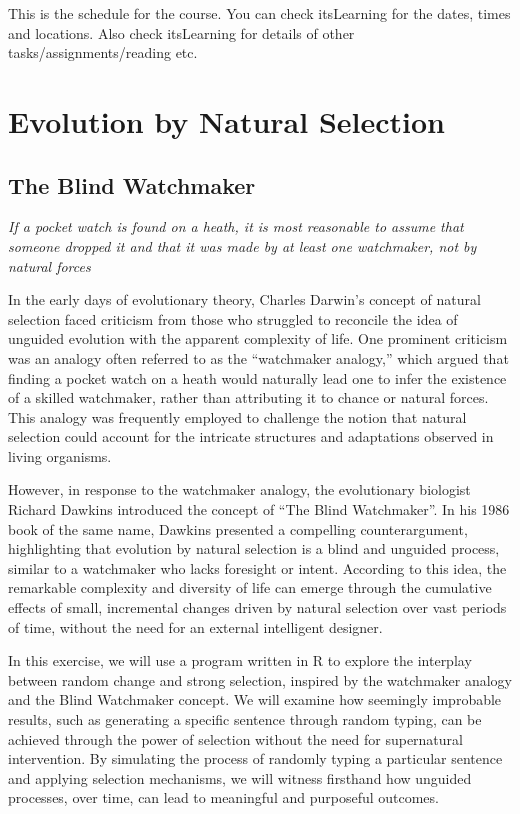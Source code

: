 \documentclass[
  a4paper]{book}
\begin{document}
This is the schedule for the course. You can check itsLearning for the dates, times and locations.
Also check itsLearning for details of other tasks/assignments/reading etc.

\hypertarget{part-evolution-by-natural-selection}{%
\part{Evolution by Natural Selection}\label{part-evolution-by-natural-selection}}

\hypertarget{the-blind-watchmaker}{%
\chapter{The Blind Watchmaker}\label{the-blind-watchmaker}}

\emph{If a pocket watch is found on a heath, it is most reasonable to assume that someone dropped it and that it was made by at least one watchmaker, not by natural forces}

In the early days of evolutionary theory, Charles Darwin's concept of natural selection faced criticism from those who struggled to reconcile the idea of unguided evolution with the apparent complexity of life. One prominent criticism was an analogy often referred to as the ``watchmaker analogy,'' which argued that finding a pocket watch on a heath would naturally lead one to infer the existence of a skilled watchmaker, rather than attributing it to chance or natural forces. This analogy was frequently employed to challenge the notion that natural selection could account for the intricate structures and adaptations observed in living organisms.

However, in response to the watchmaker analogy, the evolutionary biologist Richard Dawkins introduced the concept of ``The Blind Watchmaker''. In his 1986 book of the same name, Dawkins presented a compelling counterargument, highlighting that evolution by natural selection is a blind and unguided process, similar to a watchmaker who lacks foresight or intent. According to this idea, the remarkable complexity and diversity of life can emerge through the cumulative effects of small, incremental changes driven by natural selection over vast periods of time, without the need for an external intelligent designer.

In this exercise, we will use a program written in R to explore the interplay between random change and strong selection, inspired by the watchmaker analogy and the Blind Watchmaker concept. We will examine how seemingly improbable results, such as generating a specific sentence through random typing, can be achieved through the power of selection without the need for supernatural intervention. By simulating the process of randomly typing a particular sentence and applying selection mechanisms, we will witness firsthand how unguided processes, over time, can lead to meaningful and purposeful outcomes.
\end{document}
